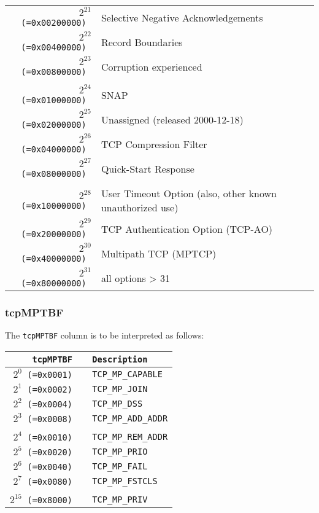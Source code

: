 \documentclass[documentation]{subfiles}
\begin{document}
\begin{longtable}{>{\tt}rl}
    $2^{21}$ (=0x00200000) & Selective Negative Acknowledgements\\
    $2^{22}$ (=0x00400000) & Record Boundaries\\
    $2^{23}$ (=0x00800000) & Corruption experienced\\
    \\
    $2^{24}$ (=0x01000000) & SNAP\\
    $2^{25}$ (=0x02000000) & Unassigned (released 2000-12-18)\\
    $2^{26}$ (=0x04000000) & TCP Compression Filter\\
    $2^{27}$ (=0x08000000) & Quick-Start Response\\
    \\
    $2^{28}$ (=0x10000000) & User Timeout Option (also, other known unauthorized use)\\
    $2^{29}$ (=0x20000000) & TCP Authentication Option (TCP-AO)\\
    $2^{30}$ (=0x40000000) & Multipath TCP (MPTCP)\\
    $2^{31}$ (=0x80000000) & all options > 31\\
    \bottomrule
\end{longtable}

\subsubsection{tcpMPTBF}\label{tcpMPTBF}
The {\tt tcpMPTBF} column is to be interpreted as follows:
\begin{longtable}{>{\tt}r>{\tt}l}
    \toprule
    {\bf tcpMPTBF} & {\bf Description}\\
    \midrule\endhead%
    $2^{0}$  (=0x0001) & TCP\_MP\_CAPABLE\\
    $2^{1}$  (=0x0002) & TCP\_MP\_JOIN\\
    $2^{2}$  (=0x0004) & TCP\_MP\_DSS\\
    $2^{3}$  (=0x0008) & TCP\_MP\_ADD\_ADDR\\
    \\
    $2^{4}$  (=0x0010) & TCP\_MP\_REM\_ADDR\\
    $2^{5}$  (=0x0020) & TCP\_MP\_PRIO\\
    $2^{6}$  (=0x0040) & TCP\_MP\_FAIL\\
    $2^{7}$  (=0x0080) & TCP\_MP\_FSTCLS\\
    \\
    $2^{15}$ (=0x8000) & TCP\_MP\_PRIV\\
    \bottomrule
\end{longtable}
\end{document}
